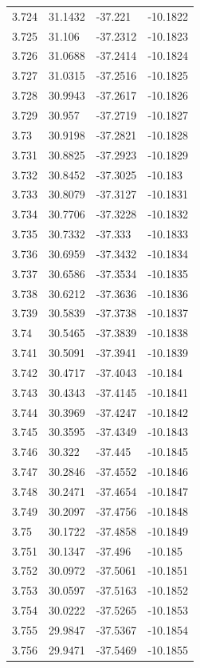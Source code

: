 \begin{tabular}{llll}
3.724 & 31.1432 & -37.221 & -10.1822 \\
3.725 & 31.106 & -37.2312 & -10.1823 \\
3.726 & 31.0688 & -37.2414 & -10.1824 \\
3.727 & 31.0315 & -37.2516 & -10.1825 \\
3.728 & 30.9943 & -37.2617 & -10.1826 \\
3.729 & 30.957 & -37.2719 & -10.1827 \\
3.73 & 30.9198 & -37.2821 & -10.1828 \\
3.731 & 30.8825 & -37.2923 & -10.1829 \\
3.732 & 30.8452 & -37.3025 & -10.183 \\
3.733 & 30.8079 & -37.3127 & -10.1831 \\
3.734 & 30.7706 & -37.3228 & -10.1832 \\
3.735 & 30.7332 & -37.333 & -10.1833 \\
3.736 & 30.6959 & -37.3432 & -10.1834 \\
3.737 & 30.6586 & -37.3534 & -10.1835 \\
3.738 & 30.6212 & -37.3636 & -10.1836 \\
3.739 & 30.5839 & -37.3738 & -10.1837 \\
3.74 & 30.5465 & -37.3839 & -10.1838 \\
3.741 & 30.5091 & -37.3941 & -10.1839 \\
3.742 & 30.4717 & -37.4043 & -10.184 \\
3.743 & 30.4343 & -37.4145 & -10.1841 \\
3.744 & 30.3969 & -37.4247 & -10.1842 \\
3.745 & 30.3595 & -37.4349 & -10.1843 \\
3.746 & 30.322 & -37.445 & -10.1845 \\
3.747 & 30.2846 & -37.4552 & -10.1846 \\
3.748 & 30.2471 & -37.4654 & -10.1847 \\
3.749 & 30.2097 & -37.4756 & -10.1848 \\
3.75 & 30.1722 & -37.4858 & -10.1849 \\
3.751 & 30.1347 & -37.496 & -10.185 \\
3.752 & 30.0972 & -37.5061 & -10.1851 \\
3.753 & 30.0597 & -37.5163 & -10.1852 \\
3.754 & 30.0222 & -37.5265 & -10.1853 \\
3.755 & 29.9847 & -37.5367 & -10.1854 \\
3.756 & 29.9471 & -37.5469 & -10.1855 \\

\end{tabular}
